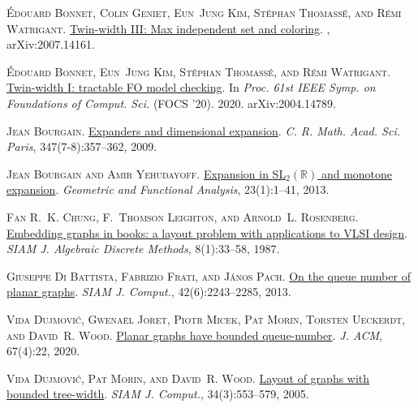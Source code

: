 \documentclass[kpfonts]{patmorin}
\begin{document}
	\textsc{\'Edouard Bonnet, Colin Geniet, Eun~Jung Kim, St\'ephan Thomass\'e, and
		R\'emi Watrigant}.
	\newblock \href{http://arxiv.org/abs/2007.14161}{Twin-width {III}: Max
		independent set and coloring}.
	, arXiv:2007.14161.
	
	\textsc{\'Edouard Bonnet, Eun~Jung Kim, St\'ephan Thomass\'e, and R\'emi
		Watrigant}.
	\newblock \href{http://arxiv.org/abs/2004.14789}{Twin-width {I}: tractable {FO}
		model checking}.
	\newblock In \emph{Proc. 61st IEEE Symp. on Foundations of Comput. Sci.} (FOCS
		'20). 2020{}.
	\newblock arXiv:2004.14789.
	
	\textsc{Jean Bourgain}.
	\newblock \href{https://doi.org/10.1016/j.crma.2009.02.009}{Expanders and
		dimensional expansion}.
	\newblock \emph{C. R. Math. Acad. Sci. Paris}, 347(7-8):357--362, 2009.
	
	\textsc{Jean Bourgain and Amir Yehudayoff}.
	\newblock \href{https://doi.org/10.1007/s00039-012-0200-9}{Expansion in
		{SL$_2(\mathbb{R})$} and monotone expansion}.
	\newblock \emph{Geometric and Functional Analysis}, 23(1):1--41, 2013.
	
	\textsc{Fan R.~K. Chung, F.~Thomson Leighton, and Arnold~L. Rosenberg}.
	\newblock \href{https://doi.org/10.1137/0608002}{Embedding graphs in books: a
		layout problem with applications to {V}{L}{S}{I} design}.
	\newblock \emph{SIAM J. Algebraic Discrete Methods}, 8(1):33--58, 1987.
	
	\textsc{Giuseppe {Di Battista}, Fabrizio Frati, and J\'anos Pach}.
	\newblock \href{https://doi.org/10.1137/130908051}{On the queue number of
		planar graphs}.
	\newblock \emph{SIAM J. Comput.}, 42(6):2243--2285, 2013.
	
	\textsc{Vida Dujmovi{\'c}, Gwena\"{e}l Joret, Piotr Micek, Pat Morin, Torsten
		Ueckerdt, and David~R. Wood}.
	\newblock \href{https://doi.org/10.1145/3385731}{Planar graphs have bounded
		queue-number}.
	\newblock \emph{J. ACM}, 67(4):22, 2020.
	
	\textsc{Vida Dujmovi{\'c}, Pat Morin, and David~R. Wood}.
	\newblock \href{https://doi.org/10.1137/S0097539702416141}{Layout of graphs
		with bounded tree-width}.
	\newblock \emph{SIAM J. Comput.}, 34(3):553--579, 2005.
	
\end{document}
